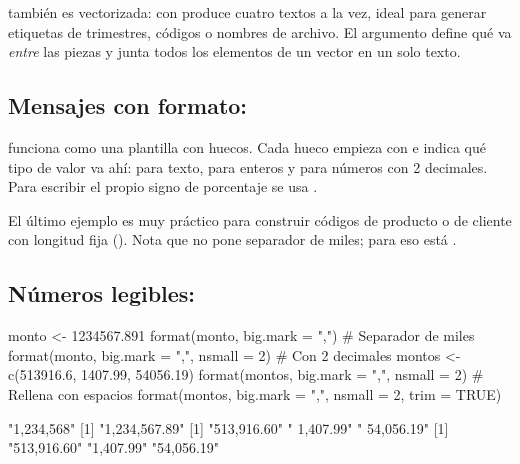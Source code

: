  también es vectorizada: con  produce cuatro
textos a la vez, ideal para generar etiquetas de trimestres, códigos o
nombres de archivo. El argumento  define qué va \emph{entre} las
piezas y  junta todos los elementos de un vector en un
solo texto.

\subsection{Mensajes con formato: \texorpdfstring{}{sprintf()}}

 funciona como una plantilla con huecos. Cada hueco
empieza con \codigo{\%} e indica qué tipo de valor va ahí: 
para texto,  para enteros y  para números con 2
decimales. Para escribir el propio signo de porcentaje se usa
\codigo{\%\%}.


El último ejemplo es muy práctico para construir códigos de producto o de
cliente con longitud fija (). Nota que
 no pone separador de miles; para eso está
.

\subsection{Números legibles: \texorpdfstring{}{format()}}

\begin{rcode}
monto <- 1234567.891
format(monto, big.mark = ",")                  # Separador de miles
format(monto, big.mark = ",", nsmall = 2)      # Con 2 decimales
montos <- c(513916.6, 1407.99, 54056.19)
format(montos, big.mark = ",", nsmall = 2)     # Rellena con espacios
format(montos, big.mark = ",", nsmall = 2, trim = TRUE)
\end{rcode}
\begin{rsalida}
[1] "1,234,568"
[1] "1,234,567.89"
[1] "513,916.60" "  1,407.99" " 54,056.19"
[1] "513,916.60" "1,407.99"   "54,056.19" 
\end{rsalida}


